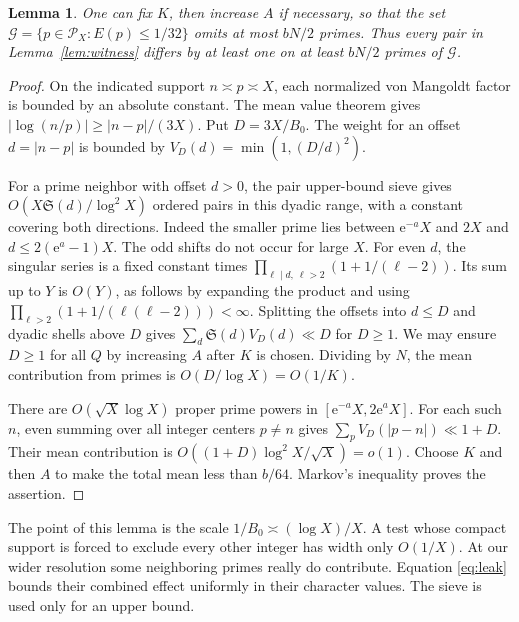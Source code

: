 \documentclass[11pt]{article}
\newtheorem{lemma}[theorem]{Lemma}
\newcommand{\me}{\mathrm e}
\newcommand{\PP}{\mathcal P}
\newcommand{\GG}{\mathcal G}
\begin{document}
\begin{lemma}\label{lem:sieve}
One can fix $K$, then increase $A$ if necessary, so that the set $\GG=\{p\in\PP_X:E(p)\le1/32\}$ omits at most $bN/2$ primes. Thus every pair in Lemma~\ref{lem:witness} differs by at least one on at least $bN/2$ primes of $\GG$.
\end{lemma}
\begin{proof}
On the indicated support $n\asymp p\asymp X$, each normalized von Mangoldt factor is bounded by an absolute constant. The mean value theorem gives $|\log(n/p)|\ge |n-p|/(3X)$. Put $D=3X/B_0$. The weight for an offset $d=|n-p|$ is bounded by $V_D(d)=\min(1,(D/d)^2)$.

For a prime neighbor with offset $d>0$, the pair upper-bound sieve \cite[Lemma 2.1]{evans} gives $O(X\mathfrak S(d)/\log^2X)$ ordered pairs in this dyadic range, with a constant covering both directions. Indeed the smaller prime lies between $\me^{-a}X$ and $2X$ and $d\le2(\me^a-1)X$. The odd shifts do not occur for large $X$. For even $d$, the singular series is a fixed constant times $\prod_{\ell\mid d,\ \ell>2}(1+1/(\ell-2))$. Its sum up to $Y$ is $O(Y)$, as follows by expanding the product and using $\prod_{\ell>2}(1+1/(\ell(\ell-2)))<\infty$. Splitting the offsets into $d\le D$ and dyadic shells above $D$ gives $\sum_d\mathfrak S(d)V_D(d)\ll D$ for $D\ge1$. We may ensure $D\ge1$ for all $Q$ by increasing $A$ after $K$ is chosen. Dividing by $N$, the mean contribution from primes is $O(D/\log X)=O(1/K)$.

There are $O(\sqrt X\log X)$ proper prime powers in $[\me^{-a}X,2\me^aX]$. For each such $n$, even summing over all integer centers $p\ne n$ gives $\sum_p V_D(|p-n|)\ll1+D$. Their mean contribution is $O((1+D)\log^2X/\sqrt X)=o(1)$. Choose $K$ and then $A$ to make the total mean less than $b/64$. Markov's inequality proves the assertion.
\end{proof}

The point of this lemma is the scale $1/B_0\asymp(\log X)/X$. A test whose compact support is forced to exclude every other integer has width only $O(1/X)$. At our wider resolution some neighboring primes really do contribute. Equation \eqref{eq:leak} bounds their combined effect uniformly in their character values. The sieve is used only for an upper bound.
\end{document}
